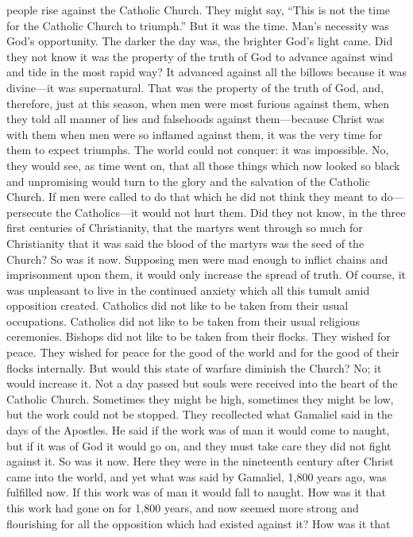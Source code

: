 people rise against the Catholic Church. They might say, ``This is not
the time for the Catholic Church to triumph.'' But it was the time. Man's
necessity was God's opportunity. The darker the day was, the brighter
God's light came. Did they not know it was the property of the truth
of God to advance against wind and tide in the most rapid way? It
advanced against all the billows because it was divine—it was
supernatural. That was the property of the truth of God, and,
therefore, just at this season, when men were most furious against
them, when they told all manner of lies and falsehoods against
them—because Christ was with them when men were so inflamed against
them, it was the very time for them to expect triumphs. The world
could not conquer: it was impossible. No, they would see, as time went
on, that all those things which now looked so black and unpromising
would turn to the glory and the salvation of the Catholic Church. If
men were called to do that which he did not think they meant to
do—persecute the Catholics—it would not hurt them. Did they not
know, in the three first centuries of Christianity, that the martyrs
went through so much for Christianity that it was said the blood of
the martyrs was the seed of the Church? So was it now. Supposing men
were mad enough to inflict chains and imprisonment upon them, it would
only increase the spread of truth. Of course, it was unpleasant to
live in the continued anxiety which all this tumult amid opposition
created. Catholics did not like to be taken from their usual
occupations. Catholics did not like to be taken from their usual
religious ceremonies. Bishops did not like to be taken from their
flocks. They wished for peace. They wished for peace for the good of
the world and for the good of their flocks internally. But would this
state of warfare diminish the Church? No; it would increase it. Not a
day passed but souls were received into the heart of the Catholic
Church. Sometimes they might be high, sometimes they might be low,
but the work could not be stopped. They recollected what Gamaliel said
in the days of the Apostles. He said if the work was of man it would
come to naught, but if it was of God it would go on, and they must
take care they did not fight against it. So was it now. Here they were
in the nineteenth century after Christ came into the world, and yet
what was said by Gamaliel, 1,800 years ago, was fulfilled now. If this
work was of man it would fall to naught. How was it that this work had
gone on for 1,800 years, and now seemed more strong and flourishing
for all the opposition which had existed against it? How was it that
